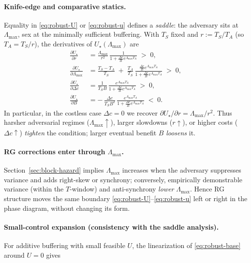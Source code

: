 \documentclass[11pt]{article}
\theoremstyle{upright}
\newcommand{\horizon}{\Lambda}
\newcommand{\Lmax}{\horizon^{(T)}_{\max}}
\renewcommand{\Lmax}{\Lambda_{\max}}
\begin{document}
\paragraph{Knife-edge and comparative statics.}
Equality in \eqref{eq:robust-U} or \eqref{eq:robust-u} defines a \emph{saddle}: the adversary sits at ${\Lmax}$, sex at the minimally sufficient buffering. With $T_S$ fixed and $r:=T_S/T_A$ (so $T_A=T_S/r$), the derivatives of $U_\star(\Lmax)$ are
\begin{align}
\frac{\partial U_\star}{\partial r}
&= \frac{{\Lmax}}{r^{2}}\,
   \frac{1}{1+\frac{\Delta c}{B}e^{{\Lmax} T_A}}
   \;>\;0,\\[4pt]
\frac{\partial U_\star}{\partial {\Lmax}}
&= \frac{T_S-T_A}{T_S}
   \;+\; \frac{T_A}{T_S}\,
        \frac{\frac{\Delta c}{B}e^{{\Lmax} T_A}}
             {1+\frac{\Delta c}{B}e^{{\Lmax} T_A}}
   \;>\;0,\\[4pt]
\frac{\partial U_\star}{\partial \Delta c}
&= \frac{1}{T_S B}\,
   \frac{e^{{\Lmax} T_A}}
        {1+\frac{\Delta c}{B}e^{{\Lmax} T_A}}
   \;>\;0,\\[4pt]
\frac{\partial U_\star}{\partial B}
&= -\,\frac{\Delta c}{T_S B^{2}}\,
     \frac{e^{{\Lmax} T_A}}
          {1+\frac{\Delta c}{B}e^{{\Lmax} T_A}}
   \;<\;0.
\end{align}
In particular, in the costless case $\Delta c=0$ we recover $\partial U_\star/\partial r = {\Lmax}/r^{2}$. Thus harsher adversarial regimes (${\Lmax}\!\uparrow$), larger slowdowns ($r\!\uparrow$), or higher costs ($\Delta c\!\uparrow$) \emph{tighten} the condition; larger eventual benefit $B$ \emph{loosens} it.

\paragraph{RG corrections enter through $\Lmax$.}
Section~\ref{sec:block-hazard} implies $\Lmax$ increases when the adversary suppresses variance and adds right-skew or synchrony; conversely, empirically demonstrable variance (within the $T$-window) and anti-synchrony \emph{lower} $\Lmax$. Hence RG structure moves the same boundary \eqref{eq:robust-U}–\eqref{eq:robust-u} left or right in the phase diagram, without changing its form.

\paragraph{Small-control expansion (consistency with the saddle analysis).}
For additive buffering with small feasible $U$, the linearization of \eqref{eq:robust-base} around $U=0$ gives
\end{document}
